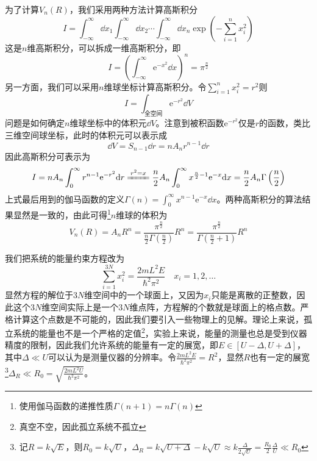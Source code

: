 \documentclass[../../main.tex]{subfiles}
\begin{document}
\begin{example}
\begin{solution}
        为了计算\(V_n(R)\)，我们采用两种方法计算高斯积分
        \begin{equation*}
            I=\int_{-\infty}^{\infty}\dd x_1\int_{-\infty}^{\infty}\dd x_2\cdots\int_{-\infty}^{\infty}\dd x_n\exp(-\sum_{i=1}^{n}x_i^2)
        \end{equation*}
        这是\(n\)维高斯积分，可以拆成一维高斯积分，即
        \begin{equation*}
            I=\left(\int_{-\infty}^{\infty}\mathrm{e}^{-x^2}\dd x\right)^n=\pi^{\frac{n}{2}}
        \end{equation*}
        另一方面，我们可以采用\(n\)维球坐标计算高斯积分。令\(\displaystyle \sum_{i=1}^{n}x_i^2=r^2\)则
        \begin{equation*}
            I=\int_{\text{全空间}}\mathrm{e}^{-r^2}\dd V
        \end{equation*}
        问题是如何确定\(n\)维球坐标中的体积元\(\dd V\)。注意到被积函数\(\mathrm{e}^{-r^2}\)仅是\(r\)的函数，类比三维空间球坐标，此时的体积元可以表示成
        \begin{equation*}
            \dd V=S_{n-1}\dd r=nA_nr^{n-1}\dd r
        \end{equation*}
        因此高斯积分可表示为
        \begin{equation*}
            I=nA_n\int_{0}^{\infty}r^{n-1}\mathrm{e}^{-r^2}\dd r\xlongequal{r^2=x}\frac{n}{2}A_n\int_{0}^{\infty}x^{\frac{n}{2}-1}\mathrm{e}^{-x}\dd x=\frac{n}{2}A_n\Gamma\left(\frac{n}{2}\right)
        \end{equation*}
        上式最后用到的伽马函数的定义\(\Gamma(n)=\int_{0}^{\infty}x^{n-1}\mathrm{e}^{-x}\dd x\)。两种高斯积分的算法结果显然是一致的，由此可得\footnote{使用伽马函数的递推性质\(\Gamma(n+1)=n\Gamma(n)\)}\(n\)维球的体积为
        \begin{equation}
            V_n(R)=A_nR^n=\frac{\pi^{\frac{n}{2}}}{\frac{n}{2}\Gamma\left(\frac{n}{2}\right)}R^n=\frac{\pi^{\frac{n}{2}}}{\Gamma\left(\frac{n}{2}+1\right)}R^n
        \end{equation}
    \end{solution}
\end{example}

我们把系统的能量约束方程改为
\begin{equation*}
    \sum_{i=1}^{3N}x_i^2=\frac{2mL^2E}{\hbar^2\pi^2} \quad x_i=1,2,\dots
\end{equation*}
显然方程的解位于\(3N\)维空间中的一个球面上，又因为\(x_i\)只能是离散的正整数，因此这个\(3N\)维空间实际上是一个\(3N\)维点阵，方程解的个数就是球面上的格点数。严格计算这个点数是不可能的，因此我们要引入一些物理上的见解。理论上来说，孤立系统的能量也不是一个严格的定值\footnote{真空不空，因此孤立系统不孤立}，实验上来说，能量的测量也总是受到仪器精度的限制，因此我们允许系统的能量有一定的展宽，即\(E\in [U-\Delta,U+\Delta] \)，其中\(\Delta\ll U\)可以认为是测量仪器的分辨率。令\(\frac{2mL^2E}{\hbar^2\pi^2}=R^2\)，显然\(R\)也有一定的展宽\footnote{记\(R=k\sqrt{E}\)，则\(R_0=k\sqrt{U}\)，\(\Delta_R=k\sqrt{U+\Delta}-k\sqrt{U}\approx k\frac{\Delta}{2\sqrt{U}}=\frac{R_0}{2}\frac{\Delta}{U}\ll R_0\)}\(\Delta_{R}\ll R_0=\sqrt{\frac{2mL^2U}{\hbar^2\pi^2}}\)。
\end{document}
